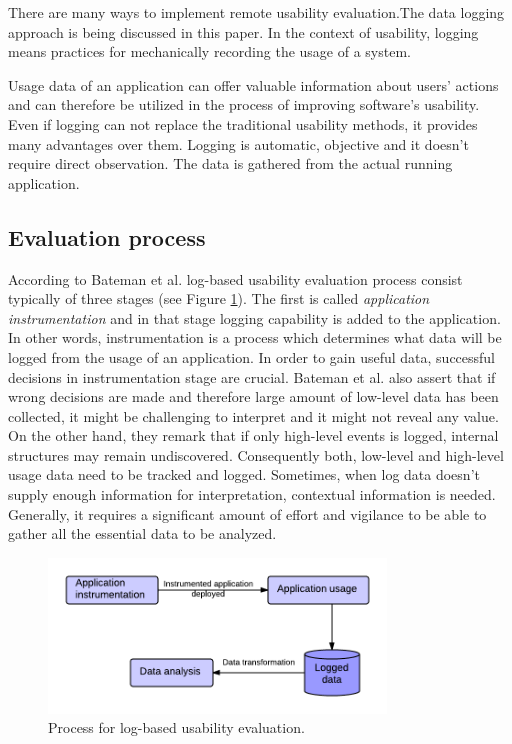\documentclass[12pt,a4paper,oneside,pdftex]{report}
\begin{document}
There are many ways to implement remote usability evaluation.The data logging approach is being discussed in this paper. In the context of usability, logging means practices for mechanically recording the usage of a system.

Usage data of an application can offer valuable information about users' actions and can therefore be utilized in the process of improving software's usability. Even if logging can not replace the traditional usability methods, it provides many advantages over them.  Logging is automatic, objective and it doesn't require direct observation. The data is gathered from the actual running application. \cite{RefWorks:24}	


\subsection{Evaluation process} 

According to Bateman et al. \cite{RefWorks:24} log-based usability evaluation process consist typically of three stages (see Figure \ref{fig:logging_usability_process}). The first is called \emph{application instrumentation} and in that stage logging capability is added to the application. In other words, instrumentation is a process which determines what data will be logged from the usage of an application. In order to gain useful data, successful decisions in instrumentation stage are crucial. Bateman et al. also assert that if wrong decisions are made and therefore large amount of low-level data has been collected, it might be challenging to interpret and it might not reveal any value. On the other hand, they remark that if only high-level events is logged, internal structures may remain undiscovered. Consequently both, low-level and high-level usage data need to be tracked and logged. Sometimes, when log data doesn't supply enough information for interpretation, contextual information is needed. Generally, it requires a significant amount of effort and vigilance to be able to gather all the essential data to be analyzed. \cite{RefWorks:24}

\begin{figure}[H]
  	\centering
  	\includegraphics[width=0.8\textwidth]{./images/logging_usability_process.png}
  	\caption{Process for log-based usability evaluation. \cite{RefWorks:24}}
	\label{fig:logging_usability_process}
\end{figure}
\end{document}
